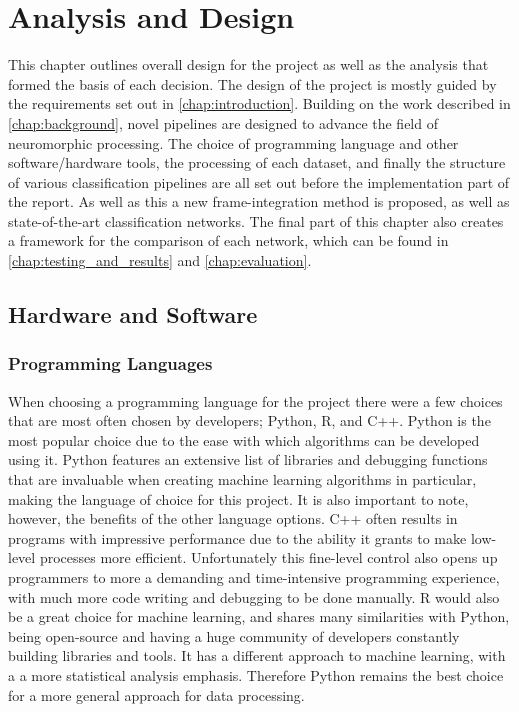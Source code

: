 \chapter{Analysis and Design} \label{chap:analysis_and_design}

This chapter outlines overall design for the project as well as the analysis that formed the basis of each decision. The design of the project is mostly guided by the requirements set out in \cref{chap:introduction}. Building on the work described in \cref{chap:background}, novel pipelines are designed to advance the field of neuromorphic processing. The choice of programming language and other software/hardware tools, the processing of each dataset, and finally the structure of various classification pipelines are all set out before the implementation part of the report. As well as this a new frame-integration method is proposed, as well as state-of-the-art classification networks. The final part of this chapter also creates a framework for the comparison of each network, which can be found in \cref{chap:testing_and_results} and \cref{chap:evaluation}.

\section{Hardware and Software}

\subsection{Programming Languages}

When choosing a programming language for the project there were a few choices that are most often chosen by developers; Python\cite{Python}, R\cite{R}, and C++\cite{C++}. Python is the most popular choice due to the ease with which algorithms can be developed using it. Python features an extensive list of libraries and debugging functions that are invaluable when creating machine learning algorithms in particular, making the language of choice for this project. It is also important to note, however, the benefits of the other language options. C++ often results in programs with impressive performance due to the ability it grants to make low-level processes more efficient. Unfortunately this fine-level control also opens up programmers to more a demanding and time-intensive programming experience, with much more code writing and debugging to be done manually. R would also be a great choice for machine learning, and shares many similarities with Python, being open-source and having a huge community of developers constantly building libraries and tools. It has a different approach to machine learning, with a a more statistical analysis emphasis. Therefore Python remains the best choice for a more general approach for data processing.

